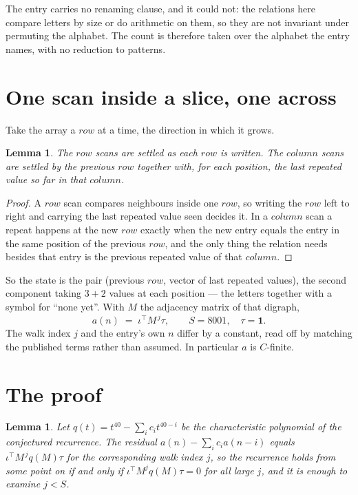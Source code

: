 \documentclass[11pt,a4paper]{article}
\theoremstyle{plain}
\newtheorem{lemma}[theorem]{Lemma}
\theoremstyle{definition}
\begin{document}
The entry carries no renaming clause, and it could not: the relations here compare letters by
size or do arithmetic on them, so they are not invariant under permuting the alphabet. The
count is therefore taken over the alphabet the entry names, with no reduction to patterns.

\section{One scan inside a slice, one across}

Take the array a $row$ at a time, the direction in which it grows.

\begin{lemma}\label{lem:state}
The $row$ scans are settled as each $row$ is written. The $column$ scans are
settled by the previous $row$ together with, for each position, the last repeated value
so far in that $column$.
\end{lemma}

\begin{proof}
A $row$ scan compares neighbours inside one $row$, so writing the
$row$ left to right and carrying the last repeated value seen decides it. In a
$column$ scan a repeat happens at the new $row$ exactly when the new entry equals the
entry in the same position of the previous $row$, and the only thing the relation needs
besides that entry is the previous repeated value of that $column$.
\end{proof}

So the state is the pair (previous $row$, vector of last repeated values), the second
component taking $3+2$ values at each position --- the letters together with a symbol for
``none yet''. With $M$ the adjacency matrix of that digraph,
\[
a(n)\;=\;\iota^{\!\top}M^{\,j}\tau ,\qquad S=8001,\quad\tau=\mathbf{1} .
\]
The walk index $j$ and the entry's own $n$ differ by a constant, read off by matching the
published terms rather than assumed. In particular $a$ is $C$-finite.

\section{The proof}

\begin{lemma}\label{lem:crit}
Let $q(t)=t^{40}-\sum_i c_it^{40-i}$ be the characteristic polynomial of the
conjectured recurrence. The residual $a(n)-\sum_ic_ia(n-i)$ equals
$\iota^{\!\top}M^{\,j}q(M)\tau$ for the corresponding walk index $j$, so the recurrence
holds from some point on if and only if $\iota^{\!\top}M^{j}q(M)\tau=0$ for all large $j$,
and it is enough to examine $j<S$.
\end{lemma}
\end{document}
